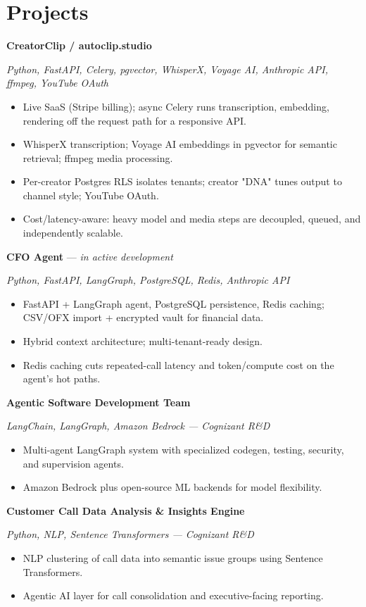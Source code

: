 \documentclass[10pt]{article}
\begin{document}
\section*{Projects}
\noindent\textbf{CreatorClip / autoclip.studio}\par
\noindent\textit{Python, FastAPI, Celery, pgvector, WhisperX, Voyage AI, Anthropic API, ffmpeg, YouTube OAuth}\par
\begin{itemize}
  \item Live SaaS (Stripe billing); async Celery runs transcription, embedding, rendering off the request path for a responsive API.
  \item WhisperX transcription; Voyage AI embeddings in pgvector for semantic retrieval; ffmpeg media processing.
  \item Per-creator Postgres RLS isolates tenants; creator "DNA" tunes output to channel style; YouTube OAuth.
  \item Cost/latency-aware: heavy model and media steps are decoupled, queued, and independently scalable.
\end{itemize}
\noindent\textbf{CFO Agent} --- \textit{in active development}\par
\noindent\textit{Python, FastAPI, LangGraph, PostgreSQL, Redis, Anthropic API}\par
\begin{itemize}
  \item FastAPI + LangGraph agent, PostgreSQL persistence, Redis caching; CSV/OFX import + encrypted vault for financial data.
  \item Hybrid context architecture; multi-tenant-ready design.
  \item Redis caching cuts repeated-call latency and token/compute cost on the agent's hot paths.
\end{itemize}
\noindent\textbf{Agentic Software Development Team}\par
\noindent\textit{LangChain, LangGraph, Amazon Bedrock — Cognizant R\&D}\par
\begin{itemize}
  \item Multi-agent LangGraph system with specialized codegen, testing, security, and supervision agents.
  \item Amazon Bedrock plus open-source ML backends for model flexibility.
\end{itemize}
\noindent\textbf{Customer Call Data Analysis \& Insights Engine}\par
\noindent\textit{Python, NLP, Sentence Transformers — Cognizant R\&D}\par
\begin{itemize}
  \item NLP clustering of call data into semantic issue groups using Sentence Transformers.
  \item Agentic AI layer for call consolidation and executive-facing reporting.
\end{itemize}
\end{document}
